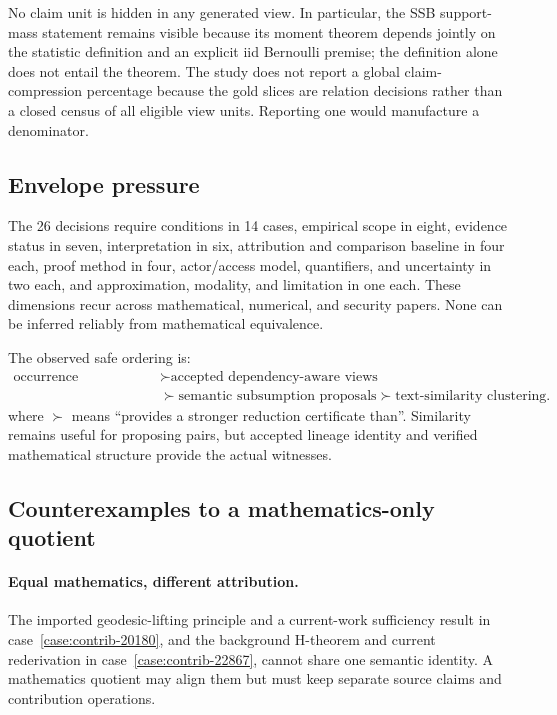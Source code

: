 No claim unit is hidden in any generated view. In particular, the SSB support-mass statement remains visible because its moment theorem depends jointly on the statistic definition and an explicit iid Bernoulli premise; the definition alone does not entail the theorem. The study does not report a global claim-compression percentage because the gold slices are relation decisions rather than a closed census of all eligible view units. Reporting one would manufacture a denominator.

\subsection{Envelope pressure}

The 26 decisions require conditions in 14 cases, empirical scope in eight, evidence status in seven, interpretation in six, attribution and comparison baseline in four each, proof method in four, actor/access model, quantifiers, and uncertainty in two each, and approximation, modality, and limitation in one each. These dimensions recur across mathematical, numerical, and security papers. None can be inferred reliably from mathematical equivalence.

The observed safe ordering is:
\begin{equation}
\begin{aligned}
\text{occurrence consolidation}
&\succ \text{accepted dependency-aware views}\\
&\succ \text{semantic subsumption proposals}
\succ \text{text-similarity clustering}.
\end{aligned}
\end{equation}
where $\succ$ means ``provides a stronger reduction certificate than''. Similarity remains useful for proposing pairs, but accepted lineage identity and verified mathematical structure provide the actual witnesses.

\subsection{Counterexamples to a mathematics-only quotient}

\paragraph{Equal mathematics, different attribution.}
The imported geodesic-lifting principle and a current-work sufficiency result in case~\ref{case:contrib-20180}, and the background H-theorem and current rederivation in case~\ref{case:contrib-22867}, cannot share one semantic identity. A mathematics quotient may align them but must keep separate source claims and contribution operations.

